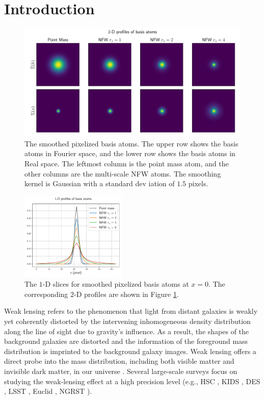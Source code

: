 \documentclass[twocolumn]{aastex63}
\begin{document}
\section{Introduction}

\begin{figure}[!t] \includegraphics[width=1.\textwidth]{nfwlet-atom-2D.pdf}
    \caption{The smoothed pixelized basis atoms. The upper row shows the basis
        atoms in Fourier space, and the lower row shows the basis atoms in Real
        space.  The leftmost column is the point mass atom, and the other
        columns are the multi-scale NFW atoms.  The smoothing kernel is
        Gaussian with a standard dev iation of $1.5$ pixels.
    } \label{fig_atoms2D}
\end{figure}

\begin{figure}
 \includegraphics[width=0.45\textwidth]{nfwlet-atom-1D.pdf}
    \caption{The $1$-D slices for smoothed pixelized basis atoms at $x=0$. The
        corresponding $2$-D profiles are shown in Figure \ref{fig_atoms2D}.
    }
 \label{fig_atoms1D}
\end{figure}

Weak lensing refers to the phenomenon that light from distant galaxies is
weakly yet coherently distorted by the intervening inhomogeneous density
distribution along the line of sight due to gravity's influence.  As a result,
the shapes of the background galaxies are distorted and the information of the
foreground mass distribution is imprinted to the background galaxy images. Weak
lensing offers a direct probe into the mass distribution, including both
visible matter and invisible dark matter, in our universe \citep[see][for
recent reviews]{revKilbinger15,revRachel17}.
Several large-scale surveys focus on studying the weak-lensing effect at a high
precision level (e.g., HSC \citep{HSC1-data}, KIDS \citep{KIDS13}, DES
\citep{DES05}, LSST \citep{LSSTScienceBook}, Euclid \citep{Euclid2011}, NGRST
\citep{WFIRST15}).
\end{document}
